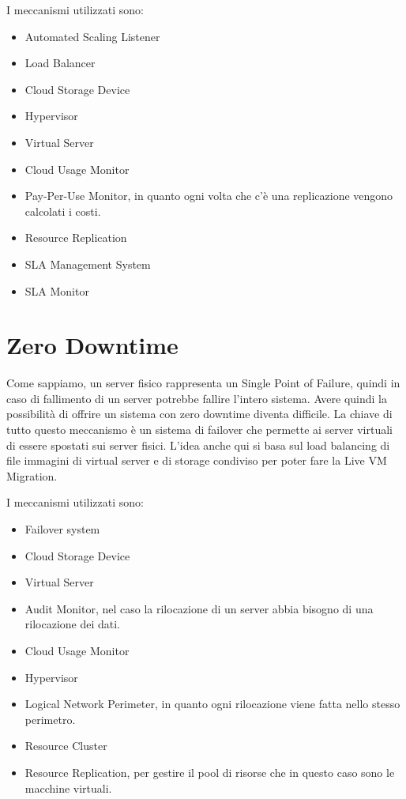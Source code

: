 I meccanismi utilizzati sono:
\begin{itemize}
    \item Automated Scaling Listener
    \item Load Balancer
    \item Cloud Storage Device
    \item Hypervisor
    \item Virtual Server
    \item Cloud Usage Monitor
    \item Pay-Per-Use Monitor, in quanto ogni volta che c'è una replicazione vengono calcolati i costi.
    \item Resource Replication
    \item SLA Management System
    \item SLA Monitor
\end{itemize}

\section{Zero Downtime}
Come sappiamo, un server fisico rappresenta un Single Point of Failure, quindi in caso di fallimento di un server potrebbe fallire l'intero sistema. Avere quindi la possibilità di offrire un sistema con zero downtime diventa difficile. La chiave di tutto questo meccanismo è un sistema di failover che permette ai server virtuali di essere spostati sui server fisici. L'idea anche qui si basa sul load balancing di file immagini di virtual server e di storage condiviso per poter fare la Live VM Migration. 

I meccanismi utilizzati sono:
\begin{itemize}
    \item Failover system
    \item Cloud Storage Device
    \item Virtual Server
    \item Audit Monitor, nel caso la rilocazione di un server abbia bisogno di una rilocazione dei dati. 
    \item Cloud Usage Monitor
    \item Hypervisor
    \item Logical Network Perimeter, in quanto ogni rilocazione viene fatta nello stesso perimetro.
    \item Resource Cluster
    \item Resource Replication, per gestire il pool di risorse che in questo caso sono le macchine virtuali.
\end{itemize}

